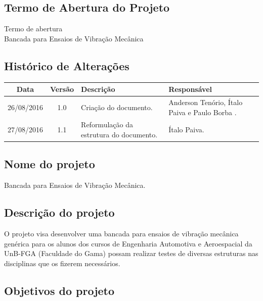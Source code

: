 \begin{apendicesenv}

\partapendices

\chapter{Termo de Abertura do Projeto}
	\label{tap}
% 	

\begin{center}
 {\large Termo de abertura}\\[0.2cm]
 {Bancada para Ensaios de Vibração Mecânica}\\
 \end{center}
 
 \section*{Histórico de Alterações}
\begin{table}[h]
\centering
\begin{tabular}{|c|c|p{6cm}|p{5cm}|}
\hline
Data & Versão & Descrição & Responsável\\
\hline                               
26/08/2016 & 1.0 & Criação do documento. & Anderson Tenório, Ítalo Paiva e Paulo Borba .\\
\hline                               
27/08/2016 & 1.1 & Reformulação da estrutura do documento. & Ítalo Paiva.\\
\hline
\end{tabular}
\end{table}

\section*{Nome do projeto}
  Bancada para Ensaios de Vibração Mecânica.
  
\section*{Descrição do projeto}

    O projeto visa desenvolver uma bancada para ensaios de vibração mecânica
    genérica para os alunos dos cursos de Engenharia Automotiva e Aeroespacial
    da UnB-FGA (Faculdade do Gama) possam realizar testes de diversas estruturas
    nas disciplinas que os fizerem necessários.

\section*{Objetivos do projeto}
  

\end{apendicesenv}
